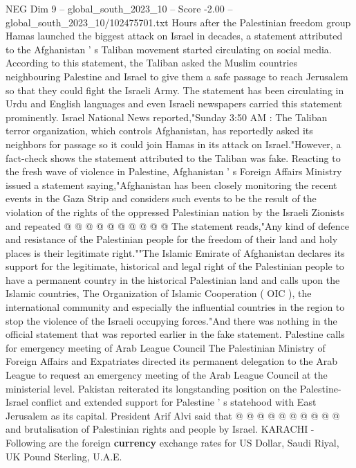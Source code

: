 \begin{textsample}{NEG Dim 9 – global\_south\_2023\_10 – Score -2.00 – global\_south\_2023\_10/102475701.txt}  \label{ex:f9_neg_423}
Hours after the Palestinian freedom group Hamas launched the biggest attack on Israel in decades, a statement attributed to the Afghanistan ' s Taliban movement started circulating on social media.
According to this statement, the Taliban asked the Muslim countries neighbouring Palestine and Israel to give them a safe passage to reach Jerusalem so that they could fight the Israeli Army.
The statement has been circulating in Urdu and English languages and even Israeli newspapers carried this statement prominently.
Israel National News reported,"Sunday 3:50 AM : The Taliban terror organization, which controls Afghanistan, has reportedly asked its neighbors for passage so it could join Hamas in its attack on Israel."However, a fact-check shows the statement attributed to the Taliban was fake.
Reacting to the fresh wave of violence in Palestine, Afghanistan ' s Foreign Affairs Ministry issued a statement saying,"Afghanistan has been closely monitoring the recent events in the Gaza Strip and considers such events to be the result of the violation of the rights of the oppressed Palestinian nation by the Israeli Zionists and repeated @ @ @ @ @ @ @ @ @ @ The statement reads,"Any kind of defence and resistance of the Palestinian people for the freedom of their land and holy places is their legitimate right.""The Islamic Emirate of Afghanistan declares its support for the legitimate, historical and legal right of the Palestinian people to have a permanent country in the historical Palestinian land and calls upon the Islamic countries, The Organization of Islamic Cooperation ( OIC ), the international community and especially the influential countries in the region to stop the violence of the Israeli occupying forces."And there was nothing in the official statement that was reported earlier in the fake statement.
Palestine calls for emergency meeting of Arab League Council The Palestinian Ministry of Foreign Affairs and Expatriates directed its permanent delegation to the Arab League to request an emergency meeting of the Arab League Council at the ministerial level.
Pakistan reiterated its longstanding position on the Palestine-Israel conflict and extended support for Palestine ' s statehood with East Jerusalem as its capital.
President Arif Alvi said that @ @ @ @ @ @ @ @ @ @ and brutalisation of Palestinian rights and people by Israel.
KARACHI - Following are the foreign \textbf{currency} exchange rates for US Dollar, Saudi Riyal, UK Pound Sterling, U.A.E.

\end{textsample}
